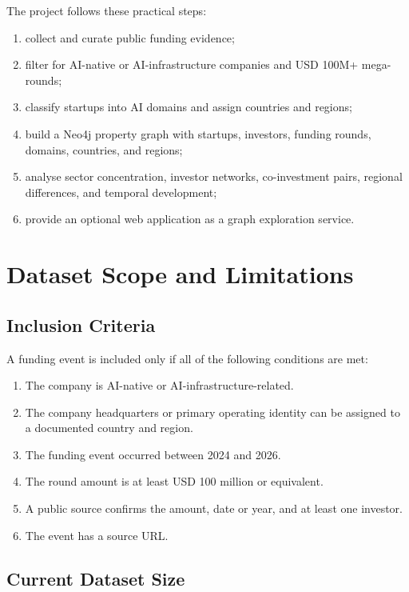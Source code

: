 \documentclass[11pt,a4paper]{article}
\begin{document}
The project follows these practical steps:

\begin{enumerate}
  \item collect and curate public funding evidence;
  \item filter for AI-native or AI-infrastructure companies and USD 100M+
        mega-rounds;
  \item classify startups into AI domains and assign countries and regions;
  \item build a Neo4j property graph with startups, investors, funding rounds,
        domains, countries, and regions;
  \item analyse sector concentration, investor networks, co-investment pairs,
        regional differences, and temporal development;
  \item provide an optional web application as a graph exploration service.
\end{enumerate}

\section{Dataset Scope and Limitations}
\label{sec:scope}

\subsection{Inclusion Criteria}

A funding event is included only if all of the following conditions are met:

\begin{enumerate}
  \item The company is AI-native or AI-infrastructure-related.
  \item The company headquarters or primary operating identity can be assigned
        to a documented country and region.
  \item The funding event occurred between 2024 and 2026.
  \item The round amount is at least USD 100 million or equivalent.
  \item A public source confirms the amount, date or year, and at least one
        investor.
  \item The event has a source URL.
\end{enumerate}

\subsection{Current Dataset Size}
\end{document}
